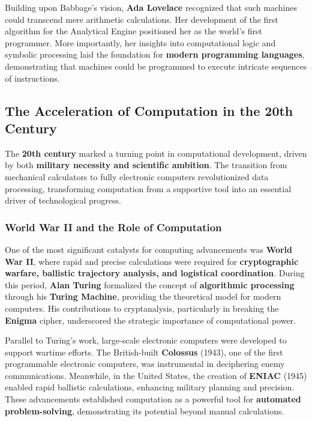 Building upon Babbage’s vision, \textbf{Ada Lovelace} recognized that such machines could transcend mere arithmetic calculations. Her development of the first algorithm for the Analytical Engine positioned her as the world’s first programmer. More importantly, her insights into computational logic and symbolic processing laid the foundation for \textbf{modern programming languages}, demonstrating that machines could be programmed to execute intricate sequences of instructions.

\subsection{The Acceleration of Computation in the 20th Century}

The \textbf{20th century} marked a turning point in computational development, driven by both \textbf{military necessity and scientific ambition}. The transition from mechanical calculators to fully electronic computers revolutionized data processing, transforming computation from a supportive tool into an essential driver of technological progress.

\subsubsection{World War II and the Role of Computation}

One of the most significant catalysts for computing advancements was \textbf{World War II}, where rapid and precise calculations were required for \textbf{cryptographic warfare, ballistic trajectory analysis, and logistical coordination}. During this period, \textbf{Alan Turing} formalized the concept of \textbf{algorithmic processing} through his \textbf{Turing Machine}, providing the theoretical model for modern computers. His contributions to cryptanalysis, particularly in breaking the \textbf{Enigma} cipher, underscored the strategic importance of computational power.

Parallel to Turing’s work, large-scale electronic computers were developed to support wartime efforts. The British-built \textbf{Colossus} (1943), one of the first programmable electronic computers, was instrumental in deciphering enemy communications. Meanwhile, in the United States, the creation of \textbf{ENIAC} (1945) enabled rapid ballistic calculations, enhancing military planning and precision. These advancements established computation as a powerful tool for \textbf{automated problem-solving}, demonstrating its potential beyond manual calculations.

